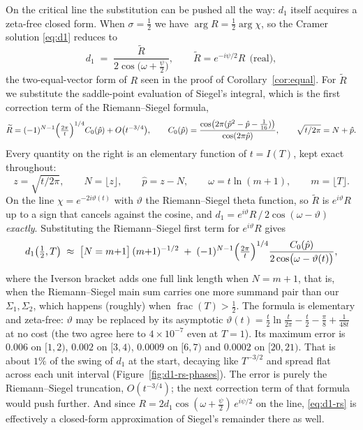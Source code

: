 \documentclass[11pt]{article}
\theoremstyle{definition}
\begin{document}
On the critical line the substitution can be pushed all the way:
$d_1$ itself acquires a zeta-free closed form. When $\sigma=\tfrac12$ we
have $\arg R=\tfrac12\arg\chi$, so the Cramer solution
\eqref{eq:d1} reduces to
\[
d_1 \;=\; \frac{\widetilde R}{2\cos\bigl(\omega+\tfrac{\psi}{2}\bigr)},
\qquad
\widetilde R = e^{-i\psi/2} R \ \ \text{(real)},
\]
the two-equal-vector form of $R$ seen in the proof of
Corollary~\ref{cor:equal}. For $\widetilde R$ we substitute the saddle-point
evaluation of Siegel's integral, which is the first correction term of the
Riemann--Siegel formula,
\[
\widetilde R
= (-1)^{N-1}\Bigl(\tfrac{2\pi}{t}\Bigr)^{1/4} C_0(\hat p)
+ O\bigl(t^{-3/4}\bigr),
\qquad
C_0(\hat p) =
\frac{\cos\bigl(2\pi(\hat p^{2}-\hat p-\tfrac{1}{16})\bigr)}{\cos(2\pi \hat p)},
\qquad \sqrt{t/2\pi} = N + \hat p .
\]
Every quantity on the right is an elementary function of $t=I(T)$, kept
exact throughout:
\[
z=\sqrt{t/2\pi},\qquad N=\lfloor z\rfloor,\qquad \hat p = z-N,\qquad
\omega = t\ln(m+1),\qquad m=\lfloor T\rfloor .
\]
On the line $\chi=e^{-2i\vartheta(t)}$ with $\vartheta$ the Riemann--Siegel
theta function, so $\widetilde R$ is $e^{i\vartheta}R$ up to a sign that
cancels against the cosine, and
$d_1 = e^{i\vartheta}R\,/\,2\cos(\omega-\vartheta)$ \emph{exactly}. Substituting
the Riemann--Siegel first term for $e^{i\vartheta}R$ gives
\begin{equation}\label{eq:d1-rs}
d_1\bigl(\tfrac12,T\bigr) \;\approx\;
\bigl[N=m{+}1\bigr]\,(m{+}1)^{-1/2}
\;+\;
(-1)^{N-1}\Bigl(\tfrac{2\pi}{t}\Bigr)^{1/4}
\frac{C_0(\hat p)}{2\cos\bigl(\omega-\vartheta(t)\bigr)},
\end{equation}
where the Iverson bracket adds one full link length when $N=m+1$,
that is, when the Riemann--Siegel main sum carries one more summand pair
than our $\Sigma_1,\Sigma_2$, which happens (roughly) when
$\operatorname{frac}(T)>\tfrac12$. The formula is elementary and
zeta-free: $\vartheta$ may be replaced by its asymptotic
$\vartheta(t)=\tfrac t2\ln\tfrac{t}{2\pi}-\tfrac t2-\tfrac\pi8+\tfrac1{48t}$
at no cost (the two agree here to $4\times10^{-7}$ even at $T=1$). Its
maximum error is $0.006$ on $[1,2)$, $0.002$ on $[3,4)$, $0.0009$ on
$[6,7)$ and $0.0002$ on $[20,21)$. That is about $1\%$ of the swing of $d_1$
at the start, decaying like $T^{-3/2}$ and spread flat across each unit
interval (Figure~\ref{fig:d1-rs-phases}). The error is purely the
Riemann--Siegel truncation, $O(t^{-3/4})$; the next correction term of
that formula would push further. And since
$R = 2d_1\cos(\omega+\tfrac{\psi}{2})\,e^{i\psi/2}$ on the line,
\eqref{eq:d1-rs} is effectively a closed-form approximation of Siegel's
remainder there as well.
\end{document}
